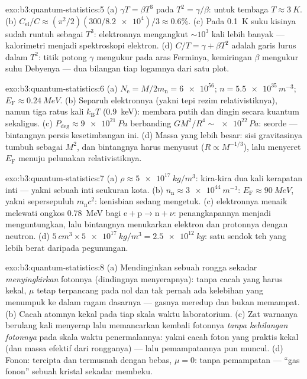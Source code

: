 \begin{solution}{exo:b3:quantum-statistics:5}
(a) $\gamma T = \beta T^3$ pada $T^2 = \gamma/\beta$: untuk tembaga
$T \approx \qty{3}{K}$. (b) $C_{\text{el}}/C \approx
(\pi^2/2)(300/\num{8.2e4})/3 \approx 0.6\%$. (c) Pada \qty{0.1}{K}
suku kisinya sudah runtuh sebagai $T^3$: elektronnya mengangkut
$\sim10^3$ kali lebih banyak --- kalorimetri menjadi spektroskopi
elektron. (d) $C/T = \gamma + \beta T^2$ adalah garis lurus dalam
$T^2$: titik potong $\gamma$ mengukur  pada
aras Ferminya, kemiringan $\beta$ mengukur suhu Debyenya --- dua bilangan
tiap logamnya dari satu plot.
\end{solution}

\begin{solution}{exo:b3:quantum-statistics:6}
(a) $N_{\text{e}} = M/2m_{\text{n}} = \num{6e56}$; $n =
\num{5.5e35}\,\unit{m^{-3}}$; $E_{\text{F}} \approx
\qty{0.24}{MeV}$. (b) Separuh  elektronnya (yakni tepi
rezim relativistiknya), namun tiga ratus kali $k_{\text{B}}T$
(\qty{0.9}{keV}): membara putih dan dingin secara kuantum sekaligus. (c)
$P_{\text{deg}} \approx \qty{9e21}{Pa}$ berbanding $GM^2/R^4 \sim
\num{e22}\,\unit{Pa}$: seorde --- bintangnya persis kesetimbangan
ini. (d) Massa yang lebih besar: sisi gravitasinya tumbuh sebagai $M^2$, dan
bintangnya harus menyusut ($R \propto M^{-1/3}$), lalu menyeret $E_{\text{F}}$
menuju pelunakan relativistiknya.
\end{solution}

\begin{solution}{exo:b3:quantum-statistics:7}
(a) $\rho \approx \qty{5e17}{kg/m^3}$: kira-kira dua kali kerapatan
inti --- yakni sebuah inti seukuran kota. (b) $n_{\text{n}}
\approx \qty{3e44}{m^{-3}}$: $E_{\text{F}} \approx \qty{90}{MeV}$,
yakni sepersepuluh $m_{\text{n}}c^2$: kenisbian sedang mengetuk. (c)  elektronnya menaik melewati ongkos \qty{0.78}{MeV} bagi
$\text{e} + \text{p} \to \text{n} + \nu$: penangkapannya menjadi
menguntungkan, lalu bintangnya menukarkan elektron dan protonnya dengan
neutron. (d) $\qty{5}{cm^3} \times \qty{5e17}{kg/m^3} =
\qty{2.5e12}{kg}$: satu sendok teh yang lebih berat daripada pegunungan.
\end{solution}

\begin{solution}{exo:b3:quantum-statistics:8}
(a) Mendinginkan sebuah rongga sekadar \emph{menyingkirkan} fotonnya
(dindingnya menyerapnya): tanpa cacah yang harus kekal, $\mu$ tetap
terpancang pada nol dan tak pernah ada kelebihan yang menumpuk ke dalam
ragam dasarnya --- gasnya meredup dan bukan memampat. (b) Cacah atomnya
kekal pada tiap skala waktu laboratorium. (c) Zat warnanya berulang kali
menyerap lalu memancarkan kembali fotonnya \emph{tanpa kehilangan
fotonnya} pada skala waktu penermalannya: yakni cacah foton yang praktis
kekal (dan massa efektif dari rongganya) --- lalu pemampatannya pun
muncul.
(d) Fonon: tercipta dan termusnah dengan bebas, $\mu = 0$: tanpa
pemampatan --- ``gas fonon'' sebuah kristal sekadar membeku.
\end{solution}

